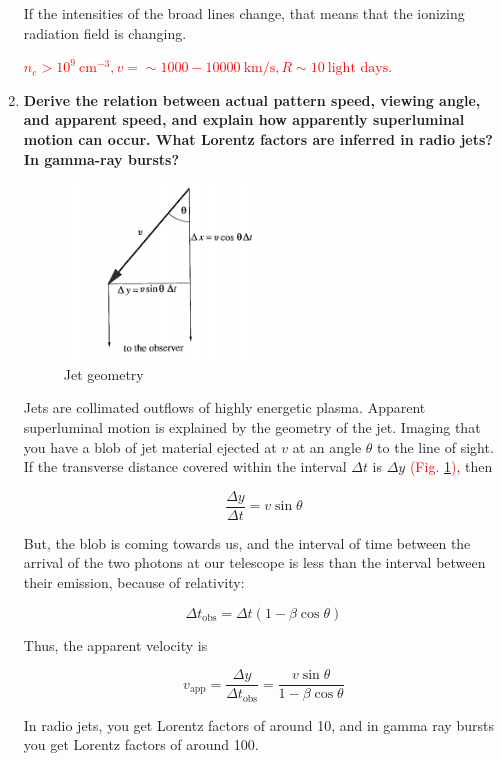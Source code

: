\documentclass[a4paper]{article}
\begin{document}
\begin{enumerate}
If the intensities of the broad lines change, that means that the ionizing radiation field is changing. 

\textcolor{red}{$n_e > 10^9 ~\textrm{cm}^{-3}, v= \sim 1000-10000 ~\textrm{km/s}, R\sim 10 ~\textrm{light days}$. }

\item \textbf{Derive the relation between actual pattern speed, viewing angle, and apparent speed, and explain how apparently superluminal motion can occur. What Lorentz factors are inferred in radio jets? In gamma-ray bursts?}

\begin{figure}
\centering
\includegraphics[width=0.5\textwidth]{jet.png} 
\caption{Jet geometry}
\label{fig_jet}
\end{figure}

Jets are collimated outflows of highly energetic plasma. Apparent superluminal motion is explained by the geometry of the jet. Imaging that you have a blob of jet material ejected at $v$ at an angle $\theta$ to the line of sight. If the transverse distance covered within the interval $\Delta t$ is $\Delta y$ \textcolor{red}{(Fig. \ref{fig_jet})}, then

$$ \frac{\Delta y}{\Delta t} = v \sin \theta $$

But, the blob is coming towards us, and the interval of time between the arrival of the two photons at our telescope is less than the interval between their emission, because of relativity:

$$ \Delta t_{\mathrm{obs}} = \Delta t (1 - \beta \cos \theta) $$

Thus, the apparent velocity is

\begin{equation}
v_\mathrm{app} = \frac{\Delta y}{\Delta t_\mathrm{obs}} = \frac{v \sin \theta}{1 - \beta \cos \theta}
\end{equation}

In radio jets, you get Lorentz factors of around 10, and in gamma ray bursts you get Lorentz factors of around 100. 


\end{enumerate}
\end{document}
